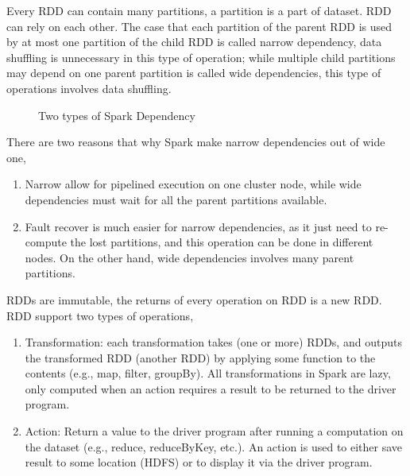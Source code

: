 Every RDD can contain many partitions, a partition is a part of dataset. RDD can rely on each other. The case that each partition of the parent RDD is used by at most one partition of the child RDD is called narrow dependency, data shuffling is unnecessary in this type of operation; while multiple child partitions may depend on one parent partition is called wide dependencies, this type of operations involves data shuffling.
\begin{figure}[h]
	\centering
	\caption{Two types of Spark Dependency\cite[p.~8]{zaharia2012resilient}}
\end{figure}

There are two reasons that why Spark make narrow dependencies out of wide one\cite[Chapter~5]{zaharia2012resilient},
\begin{enumerate}
	\item Narrow allow for pipelined execution on one cluster node, while wide dependencies must wait for all the parent partitions available.
	\item Fault recover is much easier for narrow dependencies, as it just need to re-compute the lost partitions, and this operation can be done in different nodes. On the other hand, wide dependencies involves many parent partitions.
\end{enumerate}

RDDs are immutable, the returns of every operation on RDD is a new RDD. RDD support two types of operations,

\begin{enumerate}
	\item Transformation\cite[Section~2.2]{zaharia2012resilient}: each transformation takes (one or more) RDDs, and outputs the transformed RDD (another RDD) by applying some function to the contents (e.g., map, filter, groupBy). All transformations in Spark are lazy, only computed when an action requires a result to be returned to the driver program.
	\item Action\cite[Section~2.3]{zaharia2012resilient}: Return a value to the driver program after running a computation on the dataset (e.g., reduce, reduceByKey, etc.). An action is used to either save result to some location (HDFS) or to display it via the driver program.
\end{enumerate}

